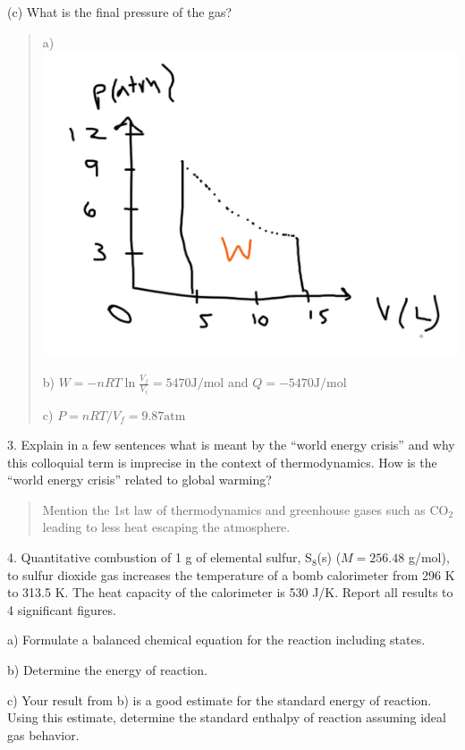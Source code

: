 \documentclass[11pt]{article}
\begin{document}
(c) What is the final pressure of the gas?

\begin{quote}
  {\color{blue}
    a) \includegraphics[scale=0.125]{sketch.png}
    
    b) $W = -nRT\ln \frac{V_f}{V_i} =  5470\text{J/mol}$ and $Q=-5470\text{J/mol}$
    
    c) $P= nRT/V_f = 9.87\text{atm}$
  }
\end{quote}

3. Explain in a few sentences what is meant by the ``world energy crisis'' and why
this colloquial term is imprecise in the context of thermodynamics. How is the
``world energy crisis'' related to global warming?

\begin{quote}
  {\color{blue} Mention the 1st law of thermodynamics and greenhouse gases such as
    CO$_2$ leading to less heat escaping the atmosphere.
  }
\end{quote}

4. Quantitative combustion of 1 g of elemental sulfur, S$_8$(s) ($M = 256.48$ g/mol),
to sulfur dioxide gas increases the temperature of a bomb calorimeter from 296 K to
313.5 K. The heat capacity of the calorimeter is 530 J/K. Report all results to 4
significant figures.

a) Formulate a balanced chemical equation for the reaction including states.

b) Determine the energy of reaction.

c) Your result from b) is a good estimate for the standard energy of reaction. Using this
estimate, determine the standard enthalpy of reaction assuming ideal gas behavior.
\end{document}
